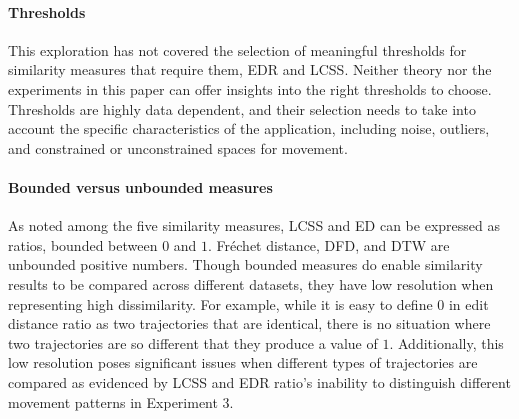\documentclass[10pt,letterpaper]{article}
\begin{document}
\paragraph{Thresholds} This exploration has not  covered the selection of meaningful thresholds  for similarity  measures that require them, EDR and LCSS. Neither theory nor the experiments in this  paper can offer insights into the right thresholds to choose. Thresholds are highly data dependent,  and their selection needs to take into account the specific characteristics of the application, including noise, outliers, and constrained or unconstrained spaces for movement.  

\paragraph{Bounded versus unbounded measures}
As noted among the five similarity measures, LCSS and ED can be expressed as ratios, bounded between $0$ and $1$. Fréchet distance, DFD, and DTW are unbounded positive numbers. Though bounded measures do enable similarity results to be compared across different datasets, they have low resolution when representing high dissimilarity. For example, while it is easy to define 0 in edit distance ratio as two trajectories that are identical, there is no situation where two trajectories are so different that they produce a value of $1$. Additionally, this low resolution poses significant issues when different types of trajectories are compared as evidenced by LCSS and EDR ratio's inability to distinguish different movement patterns in Experiment 3.

\end{document}

